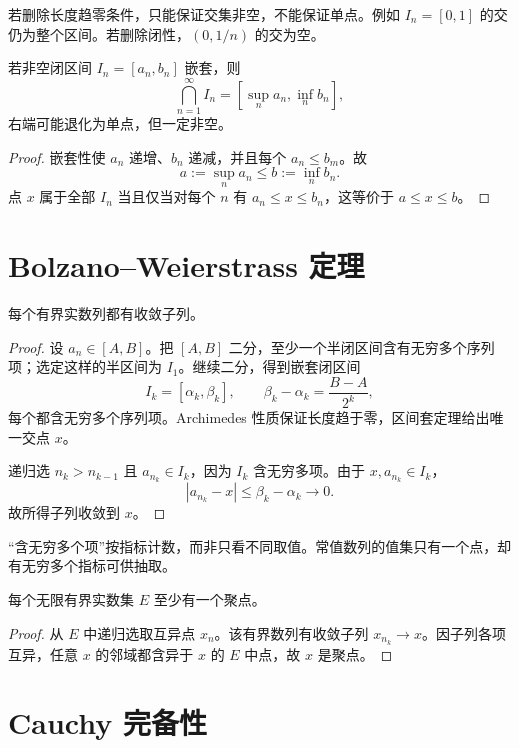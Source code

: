 若删除长度趋零条件，只能保证交集非空，不能保证单点。例如 \(I_n=[0,1]\) 的交仍为整个区间。若删除闭性，\((0,1/n)\) 的交为空。

\begin{proposition}[不要求长度趋零的闭区间套]
若非空闭区间 \(I_n=[a_n,b_n]\) 嵌套，则
\[
 \bigcap_{n=1}^{\infty}I_n
 =
 \left[\sup_n a_n,\inf_n b_n\right],
\]
右端可能退化为单点，但一定非空。
\end{proposition}

\begin{proof}
嵌套性使 \(a_n\) 递增、\(b_n\) 递减，并且每个 \(a_n\le b_m\)。故
\[
 a:=\sup_n a_n\le b:=\inf_n b_n.
\]
点 \(x\) 属于全部 \(I_n\) 当且仅当对每个 \(n\) 有 \(a_n\le x\le b_n\)，这等价于 \(a\le x\le b\)。
\end{proof}

\section{Bolzano--Weierstrass 定理}

\begin{theorem}
每个有界实数列都有收敛子列。
\end{theorem}

\begin{proof}
设 \(a_n\in[A,B]\)。把 \([A,B]\) 二分，至少一个半闭区间含有无穷多个序列项；选定这样的半区间为 \(I_1\)。继续二分，得到嵌套闭区间
\[
 I_k=[\alpha_k,\beta_k],\qquad
 \beta_k-\alpha_k=\frac{B-A}{2^k},
\]
每个都含无穷多个序列项。Archimedes 性质保证长度趋于零，区间套定理给出唯一交点 \(x\)。

递归选 \(n_k>n_{k-1}\) 且 \(a_{n_k}\in I_k\)，因为 \(I_k\) 含无穷多项。由于 \(x,a_{n_k}\in I_k\)，
\[
 |a_{n_k}-x|\le\beta_k-\alpha_k\longrightarrow0.
\]
故所得子列收敛到 \(x\)。
\end{proof}

“含无穷多个项”按指标计数，而非只看不同取值。常值数列的值集只有一个点，却有无穷多个指标可供抽取。

\begin{corollary}[有界无限集的聚点]
每个无限有界实数集 \(E\) 至少有一个聚点。
\end{corollary}

\begin{proof}
从 \(E\) 中递归选取互异点 \(x_n\)。该有界数列有收敛子列 \(x_{n_k}\to x\)。因子列各项互异，任意 \(x\) 的邻域都含异于 \(x\) 的 \(E\) 中点，故 \(x\) 是聚点。
\end{proof}

\section{Cauchy 完备性}

